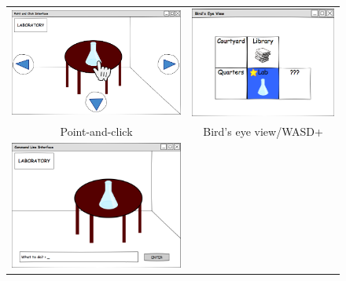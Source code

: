   \begin{figure}
    \begin{tabular}{cc}
      \includegraphics[height=0.2\textheight]{../uis/point-and-click.png} &
    \includegraphics[height=0.2\textheight]{../uis/bev-color.png}
    \\
    Point-and-click & Bird's eye view/WASD+\\
    \includegraphics[height=0.2\textheight]{../uis/parser.png} &

\end{tabular}
\end{figure}
